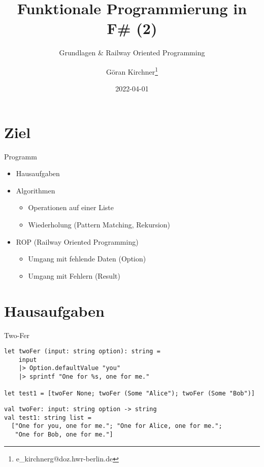 \documentclass[t]{beamer}
\author{Göran Kirchner\thanks{e\_kirchnerg@doz.hwr-berlin.de}}
\date{2022-04-01}
\title{Funktionale Programmierung in F\# (2)}
\subtitle{Grundlagen \& Railway Oriented Programming}
\begin{document}
\maketitle

\section{Ziel }
\label{sec:org8c23b44}

\begin{frame}[label={sec:orgffc641f}]{Programm}
\begin{itemize}
\item Hausaufgaben
\item Algorithmen
\begin{itemize}
\item Operationen auf einer Liste
\item Wiederholung (Pattern Matching, Rekursion)
\end{itemize}
\item ROP (Railway Oriented Programming)
\begin{itemize}
\item Umgang mit fehlende Daten (Option)
\item Umgang mit Fehlern (Result)
\end{itemize}
\end{itemize}
\end{frame}

\section{Hausaufgaben }
\label{sec:org804a676}

\begin{frame}[label={sec:org5c90def},fragile]{Two-Fer}
 \begin{verbatim}
let twoFer (input: string option): string = 
    input 
    |> Option.defaultValue "you"
    |> sprintf "One for %s, one for me."

let test1 = [twoFer None; twoFer (Some "Alice"); twoFer (Some "Bob")]
\end{verbatim}

\begin{verbatim}
val twoFer: input: string option -> string
val test1: string list =
  ["One for you, one for me."; "One for Alice, one for me.";
   "One for Bob, one for me."]
\end{verbatim}
\end{frame}
\end{document}
